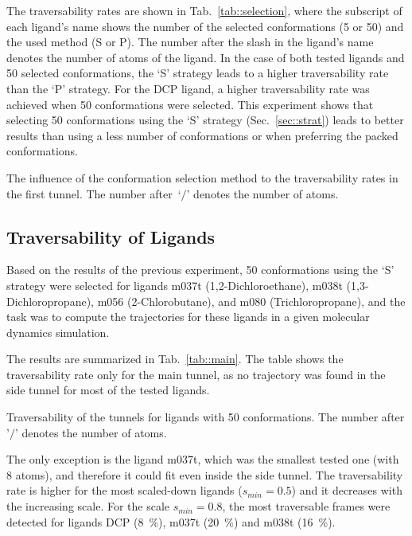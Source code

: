 \documentclass[usletter, 10pt, conference]{ieeeconf} %
\def\smin{s_{min}}
\begin{document}
The traversability rates are shown in Tab.~\ref{tab::selection}, where the subscript of each ligand's 
name shows the number of the selected conformations (5 or 50) and the used method (S or P).
The number after the slash in the ligand's name denotes the number of atoms of the ligand.
In the case of both tested ligands and 50 selected conformations, the `S' strategy leads to a higher traversability rate than the `P' strategy.
For the DCP ligand, a higher traversability rate was achieved when 50 conformations were selected.
This experiment shows that selecting 50 conformations using the `S' strategy (Sec.~\ref{sec::strat}) leads to better results
than using a less number of conformations or when preferring the packed conformations.

\begin{table}[ht]
\centering
\caption{\label{tab::selection}
    The influence of the conformation selection method to the traversability rates in the first tunnel.
    The number after~`$/$' denotes the number of atoms.
}
\small
\renewcommand{\tabcolsep}{4.3pt}
{\small
\renewcommand{\arraystretch}{0.7}

}
\end{table}


\subsection{Traversability of Ligands}

Based on the results of the previous experiment, 50 conformations using the `S' strategy were selected for ligands m037t (1,2-Dichloroethane), m038t (1,3-Dichloropropane), m056 (2-Chlorobutane), and m080 (Trichloropropane), and
the task was to compute the trajectories for these ligands in a given molecular dynamics simulation.

The results are summarized in Tab.~\ref{tab::main}.
The table shows the traversability rate only for the main tunnel, as no trajectory was found in the side tunnel for most of the tested ligands.

\begin{table}[bt]
\centering
\caption{\label{tab::main}
    Traversability of the tunnels for ligands with 50 conformations. 
    The number after '$/$' denotes the number of atoms.
}
\small
\renewcommand{\tabcolsep}{4.3pt}
{\small
\renewcommand{\arraystretch}{0.7}

}
\end{table}


The only exception is the ligand m037t, which was the smallest tested one (with 8 atoms), and therefore it could fit even inside the side tunnel.
The traversability rate is higher for the most scaled-down ligands ($\smin=0.5$) and it decreases with the increasing scale.
For the scale $\smin=0.8$, the most traversable frames were detected for ligands DCP (8~\%), m037t (20~\%) and m038t (16~\%).
\end{document}
